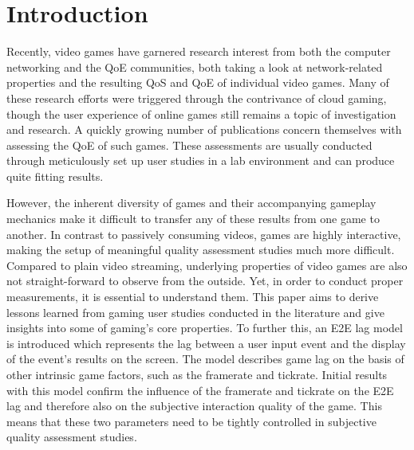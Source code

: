 \section{Introduction}
\label{sec:introduction}

Recently, video games have garnered research interest from both the computer networking and the \gls{QoE} communities, both taking a look at network-related properties and the resulting \acrshort{QoS} and \gls{QoE} of individual video games. Many of these research efforts were triggered through the contrivance of cloud gaming, though the user experience of online games still remains a topic of investigation and research. A quickly growing number of publications concern themselves with assessing the \gls{QoE} of such games. These assessments are usually conducted through meticulously set up user studies in a lab environment and can produce quite fitting results.

However, the inherent diversity of games and their accompanying gameplay mechanics make it difficult to transfer any of these results from one game to another. In contrast to passively consuming videos, games are highly interactive, making the setup of meaningful quality assessment studies much more difficult. Compared to plain video streaming, underlying properties of video games are also not straight-forward to observe from the outside. Yet, in order to conduct proper measurements, it is essential to understand them. This paper aims to derive lessons learned from gaming user studies conducted in the literature and give insights into some of gaming's core properties. To further this, an \gls{E2E} lag model is introduced which represents the lag between a user input event and the display of the event's results on the screen. The model describes game lag on the basis of other intrinsic game factors, such as the framerate and tickrate. Initial results with this model confirm the influence of the framerate and tickrate on the \gls{E2E} lag and therefore also on the subjective interaction quality of the game. This means that these two parameters need to be tightly controlled in subjective quality assessment studies.
